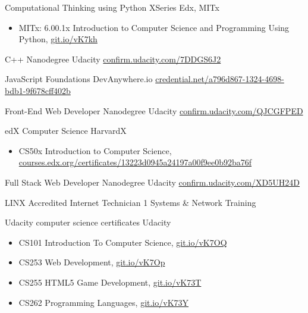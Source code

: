 \documentclass[10pt,a4paper,sans]{moderncv} %
\begin{document}
    {Computational Thinking using Python XSeries}
    {Edx, MITx}{}
    {}
    {        \begin{itemize}
            \item{ MITx: 6.00.1x Introduction to Computer Science and Programming Using Python, \href{ https://git.io/vK7kh }{ git.io/vK7kh } }
        \end{itemize}
}

    {C++ Nanodegree}
    {Udacity}{}
    { \href{ https://confirm.udacity.com/7DDGS6J2 }{ confirm.udacity.com/7DDGS6J2 } }
    {}

    {JavaScript Foundations}
    {DevAnywhere.io}{}
    { \href{ https://www.credential.net/a796d867-1324-4698-bdb1-9f678cff402b }{ credential.net/a796d867-1324-4698-bdb1-9f678cff402b } }
    {}

    {Front-End Web Developer Nanodegree}
    {Udacity}{}
    { \href{ https://confirm.udacity.com/QJCGFPED }{ confirm.udacity.com/QJCGFPED } }
    {}

    {edX Computer Science}
    {HarvardX}{}
    {}
    {        \begin{itemize}
            \item{ CS50x Introduction to Computer Science, \href{ https://courses.edx.org/certificates/13223d0945a24197a00f9ee0b92ba76f }{ courses.edx.org/certificates/13223d0945a24197a00f9ee0b92ba76f } }
        \end{itemize}
}

    {Full Stack Web Developer Nanodegree}
    {Udacity}{}
    { \href{ https://confirm.udacity.com/XD5UH24D }{ confirm.udacity.com/XD5UH24D } }
    {}

    {LINX Accredited Internet Technician 1}
    {Systems \& Network Training}{}
    {}
    {}

    {Udacity computer science certificates}
    {Udacity}{}
    {}
    {        \begin{itemize}
            \item{ CS101 Introduction To Computer Science, \href{ https://git.io/vK7OQ }{ git.io/vK7OQ } }
            \item{ CS253 Web Development, \href{ https://git.io/vK7Op }{ git.io/vK7Op } }
            \item{ CS255 HTML5 Game Development, \href{ https://git.io/vK73T }{ git.io/vK73T } }
            \item{ CS262 Programming Languages, \href{ https://git.io/vK73Y }{ git.io/vK73Y } }
        \end{itemize}
}
\end{document}
